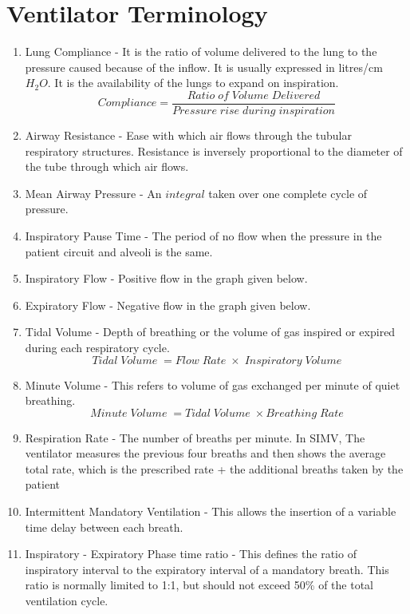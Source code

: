 \documentclass{article}
\begin{document}
\section{Ventilator Terminology}
\begin{enumerate}
    \item Lung Compliance - It is the ratio of volume delivered to the lung to the pressure caused because of the inflow. It is usually expressed in litres/cm $H_2O$. It is the availability of the lungs to expand on inspiration.
    \begin{equation}
        Compliance = \frac{Ratio\;of\;Volume\; Delivered}{Pressure\; rise\; during\; inspiration}
    \end{equation}
    \item Airway Resistance - Ease with which air flows through the tubular respiratory structures. Resistance is inversely proportional to the diameter of the tube through which air flows.
    \item Mean Airway Pressure - An $integral$ taken over one complete cycle of pressure.
    \item Inspiratory Pause Time - The period of no flow when the pressure in the patient circuit and alveoli is the same. 
    \item Inspiratory Flow - Positive flow in the graph given below.
    \item Expiratory Flow - Negative flow in the graph given below.
    \item Tidal Volume - Depth of breathing or the volume of gas inspired or expired during each respiratory cycle.
    \begin{equation}
        Tidal\; Volume\; = Flow\;Rate\;\times\;Inspiratory\; Volume
    \end{equation}
    \item Minute Volume - This refers to volume of gas exchanged per minute of quiet breathing.
    \begin{equation}
        Minute\; Volume\; = Tidal\; Volume\; \times Breathing\; Rate
    \end{equation}
    \item Respiration Rate - The number of breaths per minute. In SIMV, The ventilator measures the previous four breaths and then shows the average total rate, which is the prescribed rate + the additional breaths taken by the patient
    \item Intermittent Mandatory Ventilation - This allows the insertion of a variable time delay between each breath.
    \item Inspiratory - Expiratory Phase time ratio - This defines the ratio of inspiratory interval to the expiratory interval of a mandatory breath. This ratio is normally limited to 1:1, but should not exceed 50\% of the total ventilation cycle.

\end{enumerate}
\end{document}
